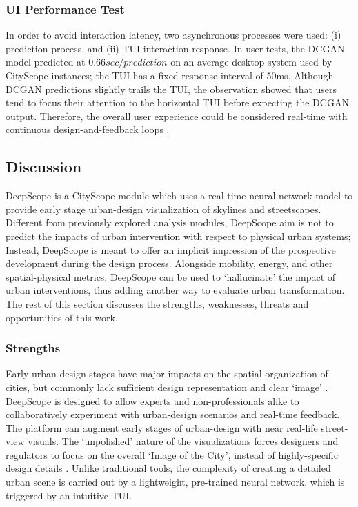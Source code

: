 {    \subsubsection{UI Performance Test}\label{deepscope-platform-and-user-interaction}
    {
        In order to avoid interaction latency, two asynchronous processes were used: (i) prediction process, and (ii) TUI interaction response. In user tests, the DCGAN model predicted at $0.66 sec/prediction$ on an average desktop system used by CityScope instances; the TUI has a fixed response interval of 50ms. Although DCGAN predictions slightly trails the TUI, the observation showed that users tend to focus their attention to the horizontal TUI before expecting the DCGAN output. Therefore, the overall user experience could be considered real-time with continuous design-and-feedback loops \cite{deber2015much}.
    }


    \subsection{Discussion}\label{deepscope-discussion}
    {
        DeepScope is a CityScope module which uses a real-time neural-network model to provide early stage urban-design visualization of skylines and streetscapes. Different from previously explored analysis modules, DeepScope aim is not to predict the impacts of urban intervention with respect to physical urban systems; Instead, DeepScope is meant to offer an implicit impression of the prospective development during the design process. Alongside mobility, energy, and other spatial-physical metrics, DeepScope can be used to `hallucinate' the impact of urban interventions, thus adding another way to evaluate urban transformation. The rest of this section discusses the strengths, weaknesses, threats and opportunities of this work.



        \subsubsection{Strengths}\label{strengths}
        {
            Early urban-design stages have major impacts on the spatial organization of cities, but commonly lack sufficient design representation and clear `image' \cite{Batty2000}. DeepScope is designed to allow experts and non-professionals alike to collaboratively experiment with urban-design scenarios and real-time feedback. The platform can augment early stages of urban-design with near real-life street-view visuals. The `unpolished' nature of the visualizations forces designers and regulators to focus on the overall `Image of the City', instead of highly-specific design details \cite{lynch1960image}. Unlike traditional tools, the complexity of creating a detailed urban scene is carried out by a lightweight, pre-trained neural network, which is triggered by an intuitive TUI.
        }

}}
